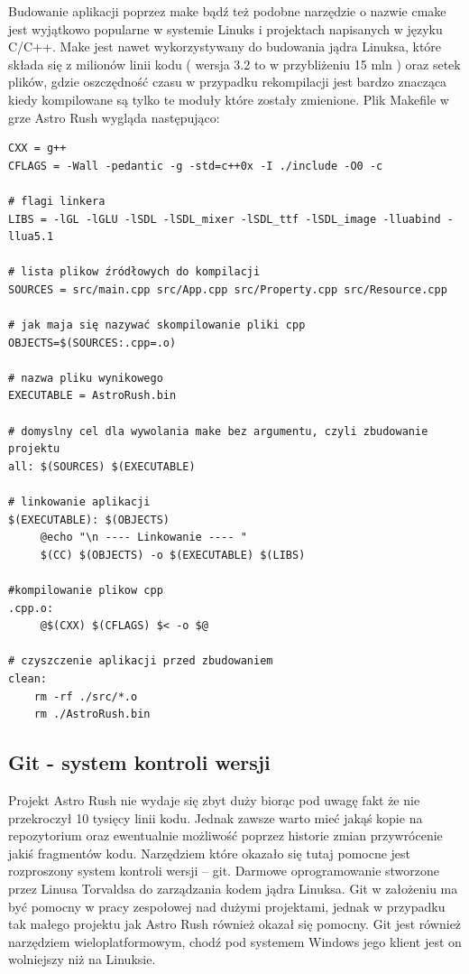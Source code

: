 Budowanie aplikacji poprzez make bądź też podobne narzędzie o nazwie cmake jest wyjątkowo popularne w systemie Linuks i projektach napisanych w języku C/C++. Make jest nawet wykorzystywany do budowania jądra Linuksa, które składa się z milionów linii kodu ( wersja 3.2 to w przybliżeniu 15 mln ) oraz setek plików, gdzie oszczędność czasu w przypadku rekompilacji jest bardzo znacząca kiedy kompilowane są tylko te moduły które zostały zmienione. Plik Makefile w grze Astro Rush wygląda następująco:
\begingroup
\fontsize{10pt}{12pt}\selectfont
\begin{verbatim}  
CXX = g++
CFLAGS = -Wall -pedantic -g -std=c++0x -I ./include -O0 -c

# flagi linkera
LIBS = -lGL -lGLU -lSDL -lSDL_mixer -lSDL_ttf -lSDL_image -lluabind -llua5.1

# lista plikow źródłowych do kompilacji
SOURCES = src/main.cpp src/App.cpp src/Property.cpp src/Resource.cpp 

# jak maja się nazywać skompilowanie pliki cpp
OBJECTS=$(SOURCES:.cpp=.o)

# nazwa pliku wynikowego
EXECUTABLE = AstroRush.bin

# domyslny cel dla wywolania make bez argumentu, czyli zbudowanie projektu
all: $(SOURCES) $(EXECUTABLE)

# linkowanie aplikacji
$(EXECUTABLE): $(OBJECTS)
	 @echo "\n ---- Linkowanie ---- "
	 $(CC) $(OBJECTS) -o $(EXECUTABLE) $(LIBS)

#kompilowanie plikow cpp
.cpp.o:
	 @$(CXX) $(CFLAGS) $< -o $@

# czyszczenie aplikacji przed zbudowaniem  
clean:
	rm -rf ./src/*.o
	rm ./AstroRush.bin 

\end{verbatim}  
\endgroup


\subsection{Git - system kontroli wersji}

Projekt Astro Rush nie wydaje się zbyt duży biorąc pod uwagę fakt że nie przekroczył 10 tysięcy linii kodu. Jednak zawsze warto mieć jakąś kopie na repozytorium oraz ewentualnie możliwość poprzez historie  zmian przywrócenie jakiś fragmentów kodu. Narzędziem które okazało się tutaj pomocne jest rozproszony system kontroli wersji – git. Darmowe oprogramowanie stworzone przez Linusa Torvaldsa do zarządzania kodem jądra Linuksa. Git w założeniu ma być pomocny w pracy zespołowej nad dużymi projektami, jednak w przypadku tak małego projektu jak Astro Rush również okazał się pomocny. Git jest również narzędziem wieloplatformowym, chodź pod systemem Windows jego klient jest on wolniejszy niż na Linuksie.

